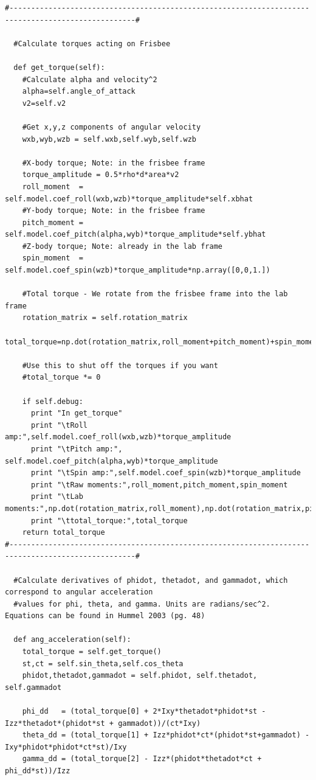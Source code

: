 \documentclass[a4paper,12pt, oneside]{article}
\begin{document}
\begin{verbatim}
#---------------------------------------------------------------------------------------------------#

  #Calculate torques acting on Frisbee

  def get_torque(self):
    #Calculate alpha and velocity^2
    alpha=self.angle_of_attack
    v2=self.v2

    #Get x,y,z components of angular velocity
    wxb,wyb,wzb = self.wxb,self.wyb,self.wzb

    #X-body torque; Note: in the frisbee frame
    torque_amplitude = 0.5*rho*d*area*v2
    roll_moment  = self.model.coef_roll(wxb,wzb)*torque_amplitude*self.xbhat
    #Y-body torque; Note: in the frisbee frame
    pitch_moment = self.model.coef_pitch(alpha,wyb)*torque_amplitude*self.ybhat
    #Z-body torque; Note: already in the lab frame
    spin_moment  = self.model.coef_spin(wzb)*torque_amplitude*np.array([0,0,1.])

    #Total torque - We rotate from the frisbee frame into the lab frame
    rotation_matrix = self.rotation_matrix
    total_torque=np.dot(rotation_matrix,roll_moment+pitch_moment)+spin_moment

    #Use this to shut off the torques if you want
    #total_torque *= 0

    if self.debug:
      print "In get_torque"
      print "\tRoll amp:",self.model.coef_roll(wxb,wzb)*torque_amplitude
      print "\tPitch amp:", self.model.coef_pitch(alpha,wyb)*torque_amplitude
      print "\tSpin amp:",self.model.coef_spin(wzb)*torque_amplitude
      print "\tRaw moments:",roll_moment,pitch_moment,spin_moment
      print "\tLab moments:",np.dot(rotation_matrix,roll_moment),np.dot(rotation_matrix,pitch_moment),spin_moment
      print "\ttotal_torque:",total_torque
    return total_torque
#---------------------------------------------------------------------------------------------------#

  #Calculate derivatives of phidot, thetadot, and gammadot, which correspond to angular acceleration
  #values for phi, theta, and gamma. Units are radians/sec^2. Equations can be found in Hummel 2003 (pg. 48)

  def ang_acceleration(self):
    total_torque = self.get_torque()
    st,ct = self.sin_theta,self.cos_theta
    phidot,thetadot,gammadot = self.phidot, self.thetadot, self.gammadot

    phi_dd   = (total_torque[0] + 2*Ixy*thetadot*phidot*st - Izz*thetadot*(phidot*st + gammadot))/(ct*Ixy)
    theta_dd = (total_torque[1] + Izz*phidot*ct*(phidot*st+gammadot) - Ixy*phidot*phidot*ct*st)/Ixy
    gamma_dd = (total_torque[2] - Izz*(phidot*thetadot*ct + phi_dd*st))/Izz


\end{verbatim}
\end{document}
